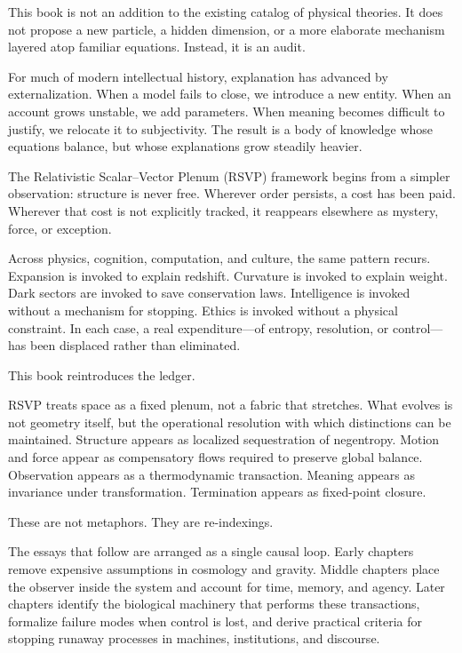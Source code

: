 \documentclass[11pt]{book}
\begin{document}
This book is not an addition to the existing catalog of physical theories. It does not propose a new particle, a hidden dimension, or a more elaborate mechanism layered atop familiar equations. Instead, it is an audit.

For much of modern intellectual history, explanation has advanced by externalization. When a model fails to close, we introduce a new entity. When an account grows unstable, we add parameters. When meaning becomes difficult to justify, we relocate it to subjectivity. The result is a body of knowledge whose equations balance, but whose explanations grow steadily heavier.

The Relativistic Scalar--Vector Plenum (RSVP) framework begins from a simpler observation: structure is never free. Wherever order persists, a cost has been paid. Wherever that cost is not explicitly tracked, it reappears elsewhere as mystery, force, or exception.

Across physics, cognition, computation, and culture, the same pattern recurs. Expansion is invoked to explain redshift. Curvature is invoked to explain weight. Dark sectors are invoked to save conservation laws. Intelligence is invoked without a mechanism for stopping. Ethics is invoked without a physical constraint. In each case, a real expenditure---of entropy, resolution, or control---has been displaced rather than eliminated.

This book reintroduces the ledger.

RSVP treats space as a fixed plenum, not a fabric that stretches. What evolves is not geometry itself, but the operational resolution with which distinctions can be maintained. Structure appears as localized sequestration of negentropy. Motion and force appear as compensatory flows required to preserve global balance. Observation appears as a thermodynamic transaction. Meaning appears as invariance under transformation. Termination appears as fixed-point closure.

These are not metaphors. They are re-indexings.

The essays that follow are arranged as a single causal loop. Early chapters remove expensive assumptions in cosmology and gravity. Middle chapters place the observer inside the system and account for time, memory, and agency. Later chapters identify the biological machinery that performs these transactions, formalize failure modes when control is lost, and derive practical criteria for stopping runaway processes in machines, institutions, and discourse.
\end{document}
